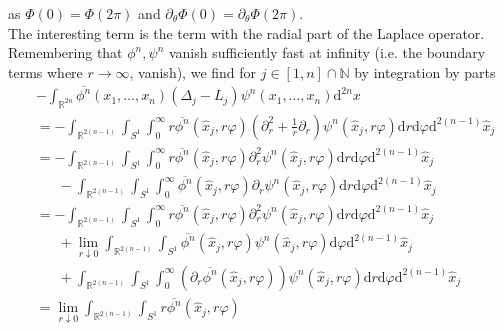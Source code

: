 as $\Phi(0) = \Phi(2\pi)$ and $\partial_{\theta}\Phi(0) = \partial_{\theta}\Phi(2\pi)$.
\\
The interesting term is the term with the radial part of the Laplace operator. Remembering that $\phi^{n},\psi^{n}$ vanish sufficiently fast at infinity (i.e. the boundary terms where $r \to \infty$, vanish), we find for $j \in [1,n] \cap \mathbb{N}$ by integration by parts
\begin{align*}
  &
  -
  \int_{\mathbb{R}^{2n}}
  \overline{\phi^{n}}
  \left(
    x_{1}
    ,
    \dots
    ,
    x_{n}
  \right)
  (\Delta_{j} - L_{j})
  \psi^{n}
  \left(
    x_{1}
    ,
    \dots
    ,
    x_{n}
  \right)
  \mathrm{d}^{2n}x
  \\
  &=
  -
  \int_{\mathbb{R}^{2(n-1)}}
  \int_{S^{1}}
  \int_{0}^{\infty}
  r
  \overline{\phi^{n}}(\hat{x}_{j},r\varphi)
  \left(
    \partial_{r}^{2}
    +
    \frac{1}{r}
    \partial_{r}
  \right)
  \psi^{n}(\hat{x}_{j},r\varphi)
  \mathrm{d}r
  \mathrm{d}\varphi
  \mathrm{d}^{2(n-1)}\hat{x}_{j}
  \\
  &=
  -
  \int_{\mathbb{R}^{2(n-1)}}
  \int_{S^{1}}
  \int_{0}^{\infty}
  r
  \overline{\phi^{n}}(\hat{x}_{j},r\varphi)
  \partial_{r}^{2}
  \psi^{n}(\hat{x}_{j},r\varphi)
  \mathrm{d}r
  \mathrm{d}\varphi
  \mathrm{d}^{2(n-1)}\hat{x}_{j}
  \\
  &\phantom{=\ }
  -
  \int_{\mathbb{R}^{2(n-1)}}
  \int_{S^{1}}
  \int_{0}^{\infty}
  \overline{\phi^{n}}(\hat{x}_{j},r\varphi)
  \partial_{r}
  \psi^{n}(\hat{x}_{j},r\varphi)
  \mathrm{d}r
  \mathrm{d}\varphi
  \mathrm{d}^{2(n-1)}\hat{x}_{j}
  \\
  &=
  -
  \int_{\mathbb{R}^{2(n-1)}}
  \int_{S^{1}}
  \int_{0}^{\infty}
  r
  \overline{\phi^{n}}(\hat{x}_{j},r\varphi)
  \partial_{r}^{2}
  \psi^{n}(\hat{x}_{j},r\varphi)
  \mathrm{d}r
  \mathrm{d}\varphi
  \mathrm{d}^{2(n-1)}\hat{x}_{j}
  \\
  &\phantom{=\ }
  +
  \lim_{r \downarrow 0}
  \int_{\mathbb{R}^{2(n-1)}}
  \int_{S^{1}}
  \overline{\phi^{n}}(\hat{x}_{j},r\varphi)
  \psi^{n}(\hat{x}_{j},r\varphi)
  \mathrm{d}\varphi
  \mathrm{d}^{2(n-1)}\hat{x}_{j}
  \\
  &\phantom{=\ }
  +
  \int_{\mathbb{R}^{2(n-1)}}
  \int_{S^{1}}
  \int_{0}^{\infty}
  \left(
    \partial_{r}
    \overline{\phi^{n}}(\hat{x}_{j},r\varphi)
  \right)
  \psi^{n}(\hat{x}_{j},r\varphi)
  \mathrm{d}r
  \mathrm{d}\varphi
  \mathrm{d}^{2(n-1)}\hat{x}_{j}
  \\
  &=
  \lim_{r \downarrow 0}
  \int_{\mathbb{R}^{2(n-1)}}
  \int_{S^{1}}
  r
  \overline{\phi^{n}}(\hat{x}_{j},r\varphi)

\end{align*}
